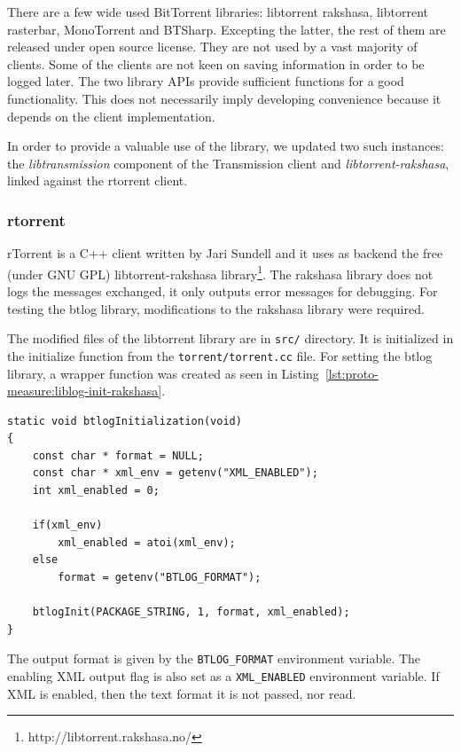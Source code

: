 There are a few wide used BitTorrent libraries: libtorrent rakshasa,
libtorrent rasterbar, MonoTorrent and BTSharp. Excepting the latter, the rest
of them are released under open source license. They are not used by a vast
majority of clients. Some of the clients are not keen on saving information in
order to be logged later. The two library APIs provide sufficient functions
for a good functionality. This does not necessarily imply developing
convenience because it depends on the client implementation.

In order to provide a valuable use of the library, we updated two such
instances: the \textit{libtransmission} component of the Transmission client
and \textit{libtorrent-rakshasa}, linked against the rtorrent client.

\subsubsection{rtorrent}

rTorrent is a C++ client written by Jari Sundell and it uses as backend the
free (under GNU GPL) libtorrent-rakshasa
library\footnote{http://libtorrent.rakshasa.no/}. The rakshasa library does
not logs the messages exchanged, it only outputs error messages for debugging.
For testing the btlog library, modifications to the rakshasa library were
required.

The modified files of the libtorrent library are in \texttt{src/} directory.
It is initialized in the initialize function from the
\texttt{torrent/torrent.cc} file. For setting the btlog library, a wrapper
function was created as seen in
Listing~\ref{lst:proto-measure:liblog-init-rakshasa}.

\lstset{language=C,caption=Initializing Logging Library for
libtorrent-rakshasa,label=lst:proto-measure:liblog-init-rakshasa}
\begin{lstlisting}
static void btlogInitialization(void)
{
    const char * format = NULL;
    const char * xml_env = getenv("XML_ENABLED");
    int xml_enabled = 0;

    if(xml_env)
        xml_enabled = atoi(xml_env);
    else
        format = getenv("BTLOG_FORMAT");

    btlogInit(PACKAGE_STRING, 1, format, xml_enabled);
}
\end{lstlisting}

The output format is given by the \texttt{BTLOG\_FORMAT} environment variable.
The enabling XML output flag is also set as a \texttt{XML\_ENABLED}
environment variable. If XML is enabled, then the text format it is not
passed, nor read.

